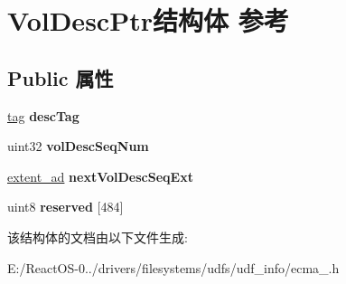 \hypertarget{struct_vol_desc_ptr}{}\section{Vol\+Desc\+Ptr结构体 参考}
\label{struct_vol_desc_ptr}
\subsection*{Public 属性}
\begin{DoxyCompactItemize}
\item 
\mbox{\label{struct_vol_desc_ptr_ac0a00c520c193c41748bdb0b4d8cec09}} 
\hyperlink{structtag}{tag} {\bfseries desc\+Tag}
\item 
\mbox{\label{struct_vol_desc_ptr_a1437ef6603694e2a2af800046bec446f}} 
uint32 {\bfseries vol\+Desc\+Seq\+Num}
\item 
\mbox{\label{struct_vol_desc_ptr_a8226ff048f1714eaeccf92bf29980099}} 
\hyperlink{struct___e_x_t_e_n_t___a_d}{extent\+\_\+ad} {\bfseries next\+Vol\+Desc\+Seq\+Ext}
\item 
\mbox{\label{struct_vol_desc_ptr_aa54651cfaca1d077516e21d3ff2b2c66}} 
uint8 {\bfseries reserved} \mbox{[}484\mbox{]}
\end{DoxyCompactItemize}


该结构体的文档由以下文件生成\+:\begin{DoxyCompactItemize}
\item 
E\+:/\+React\+O\+S-\/0../drivers/filesystems/udfs/udf\+\_\+info/ecma\+\_.\+h\end{DoxyCompactItemize}
